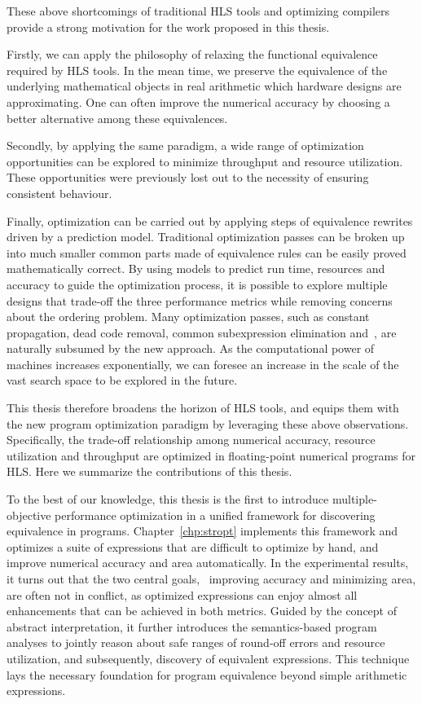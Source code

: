 These above shortcomings of traditional HLS tools and optimizing compilers
provide a strong motivation for the work proposed in this thesis.

Firstly, we can apply the philosophy of relaxing the functional equivalence
required by HLS tools.  In the mean time, we preserve the equivalence of the
underlying mathematical objects in real arithmetic which hardware designs are
approximating.  One can often improve the numerical accuracy by choosing a
better alternative among these equivalences.

Secondly, by applying the same paradigm, a wide range of optimization
opportunities can be explored to minimize throughput and resource utilization.
These opportunities were previously lost out to the necessity of ensuring
consistent behaviour.

Finally, optimization can be carried out by applying steps of equivalence
rewrites driven by a prediction model.  Traditional optimization passes can
be broken up into much smaller common parts made of equivalence rules can be
easily proved mathematically correct.  By using models to predict run time,
resources and accuracy to guide the optimization process, it is possible to
explore multiple designs that trade-off the three performance metrics while
removing concerns about the ordering problem.  Many optimization passes, such
as constant propagation, dead code removal, common subexpression elimination
and~\etc, are naturally subsumed by the new approach.  As the computational
power of machines increases exponentially, we can foresee an increase in the
scale of the vast search space to be explored in the future.

This thesis therefore broadens the horizon of HLS tools, and equips them with
the new program optimization paradigm by leveraging these above observations.
Specifically, the trade-off relationship among numerical accuracy, resource
utilization and throughput are optimized in floating-point numerical programs
for HLS\@.  Here we summarize the contributions of this thesis.

To the best of our knowledge, this thesis is the first to introduce
multiple-objective performance optimization in a unified framework for
discovering equivalence in programs.  Chapter~\ref{chp:stropt} implements
this framework and optimizes a suite of expressions that are difficult to
optimize by hand, and improve numerical accuracy and area automatically.
In the experimental results, it turns out that the two central goals,
\ie~improving accuracy and minimizing area, are often not in conflict, as
optimized expressions can enjoy almost all enhancements that can be achieved
in both metrics.  Guided by the concept of abstract interpretation, it further
introduces the semantics-based program analyses to jointly reason about
safe ranges of round-off errors and resource utilization, and subsequently,
discovery of equivalent expressions.  This technique lays the necessary
foundation for program equivalence beyond simple arithmetic expressions.

